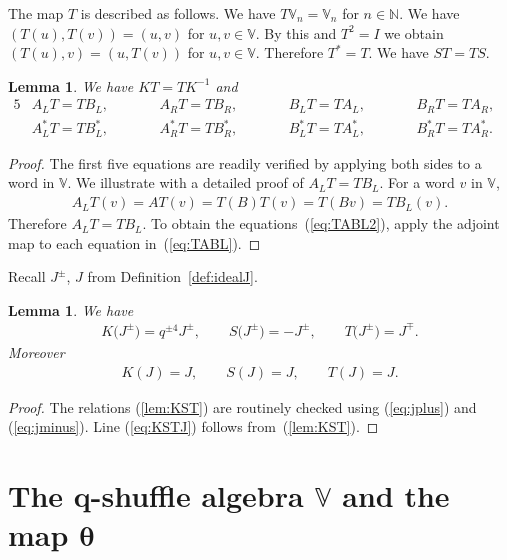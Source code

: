 \documentclass[pdftex]{sigma}
\numberwithin{equation}{section}
\newtheorem{Lemma}[Theorem]{Lemma}
\begin{document}
The map $T$ is described as follows. We have $T\mathbb V_n=\mathbb V_n$ for $n \in \mathbb N$. We have
$(T(u), T(v))=(u,v)$ for $u,v \in \mathbb V$.
By this and $T^2=I$ we obtain
$(T(u), v)=(u,T(v))$ for $u,v \in \mathbb V$.
Therefore
$T^*=T$. We have
$ST=TS$.
\begin{Lemma}
\label{lem:Tact}
We have $KT=TK^{-1}$ and
\begin{alignat}{5}
& A_L T = T B_L, \qquad &&
A_R T = T B_R, \qquad &&
B_L T = T A_L, \qquad &&
B_R T = T A_R, & \label{eq:TABL}\\
& A^*_L T = T B^*_L, \qquad &&
A^*_R T = T B^*_R, \qquad &&
B^*_L T = T A^*_L, \qquad &&
B^*_R T = T A^*_R. &\label{eq:TABL2}
\end{alignat}
\end{Lemma}
\begin{proof} The first five equations are readily verified by applying both sides to a word in $\mathbb V$.
We illustrate with a detailed proof of $A_L T = T B_L$.
For a word $v$ in $\mathbb V$,
\begin{gather*}
A_L T(v) = A T(v) = T(B)T(v) = T(Bv) = T B_L(v).
\end{gather*}
Therefore $A_L T = T B_L$. To obtain the equations~(\ref{eq:TABL2}), apply the adjoint map to each equation in~(\ref{eq:TABL}).
\end{proof}

Recall $J^{\pm}$, $J$ from Definition~\ref{def:idealJ}.

\begin{Lemma}\label{lem:Jinv}We have
\begin{gather}\label{lem:KST}
K\big(J^{\pm }\big) = q^{\pm 4} J^{\pm },
\qquad
S\big(J^{\pm }\big) = -J^{\pm },
\qquad
T\big(J^{\pm }\big) = J^{\mp }.
\end{gather}
Moreover
\begin{gather}\label{eq:KSTJ}
K (J) = J, \qquad S (J) = J, \qquad T (J) = J.
\end{gather}
\end{Lemma}
\begin{proof}  The relations
(\ref{lem:KST}) are routinely checked using
(\ref{eq:jplus}) and
(\ref{eq:jminus}).
Line (\ref{eq:KSTJ}) follows from~(\ref{lem:KST}).
\end{proof}

\section[The $q$-shuffle algebra $\mathbb V$ and the map $\theta$]{The $\boldsymbol{q}$-shuffle algebra $\boldsymbol{\mathbb V}$ and the map $\boldsymbol{\theta}$}\label{section6}
\end{document}
